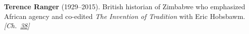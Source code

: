 \textbf{Terence Ranger} (1929–2015). British historian of Zimbabwe who emphasized African agency and co-edited \emph{The Invention of Tradition} with Eric Hobsbawm. \emph{[Ch.~\hyperref[ch:christmastruce1914]{38}]}

